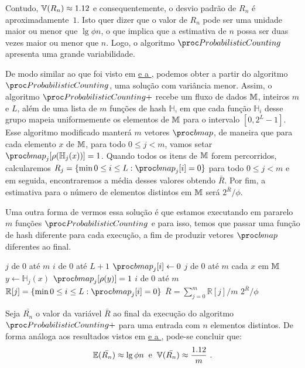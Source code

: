 Contudo, $\Vbb(R_n) \approx\nolinebreak 1.12$ e consequentemente, o desvio padrão de $R_n$ é aproximadamente~$1$. 
Isto quer dizer que o valor de $R_n$ pode ser uma unidade maior ou menor que $\lg \phi n$, o que implica que a 
estimativa de $n$ possa ser duas vezes maior ou menor que $n$. Logo, o algoritmo $\pc$ apresenta uma grande 
variabilidade.

De modo similar ao que foi visto em \hyperref[sec:morris:plus]{ e a }, 
podemos obter a partir do algoritmo~$\pc$, uma solução com variância menor. Assim, o algoritmo $\pc{+}$ recebe um fluxo 
de dados $\mathbb{M}$, inteiros $m$ e $L$, além de uma lista de $m$ funções de hash $\mathbb{H}$, em que cada função 
$\mathbb{H}_i$ desse grupo mapeia uniformemente os elementos de $\mathbb{M}$ para o intervalo $[0, 2^L - 1]$. Esse algoritmo 
modificado manterá $m$ vetores $\bitmap$, de maneira que para cada elemento $x$ de $\mathbb{M}$, para todo $0 \leq j < m$, 
vamos setar $\bitmap_j[\rho(\mathbb{H}_{j}(x))] = 1$. Quando todos os itens de $\mathbb{M}$ forem percorridos, calcularemos 
$R_j = \{ \min 0 \leq i \leq L: \bitmap_{j}[i] = 0 \}$ para todo $0 \leq j < m$ e em seguida, encontraremos a média 
desses valores obtendo $\bar{R}$. Por fim, a estimativa para o número de elementos distintos em $\mathbb{M}$ será 
$2^{\bar{R}} / \phi$. 

Uma outra forma de vermos essa solução é que estamos executando em pararelo $m$ funções $\pc$ e para isso, temos que 
passar uma função de hash diferente para cada execução, a fim de produzir vetores $\bitmap$ diferentes ao final.

\begin{codebox}
  \li \For $j$ de $0$ até $m$
      \Do
  \li    \For $i$ de $0$ até $L + 1$
          \Do
  \li       $\bitmap_{j}[i] \gets 0$
          \End
      \End
  \li \For $j$ de $0$ até $m$
      \Do
  \li    \For cada $x$ em $\mathbb{M}$
          \Do
  \li       $y \gets \mathbb{H}_{j}(x)$
  \li       $\bitmap_j[\rho(y)] = 1$
          \End
      \End
  \li \For $i$ de $0$ até $m$
      \Do
  \li    $\mathbb{R}[j] = \{ \min 0 \leq i \leq L: \bitmap_{j}[i] = 0 \}$
      \End
  \li $\bar{R} = \sum_{j=0}^{m} \mathbb{R}[j] / m$
  \li \Return $2^{\bar{R}}/\phi$
  \End
\end{codebox}

Seja $\bar{R_n}$ o valor da variável $\bar{R}$ ao final da execução do algoritmo~$\pc{+}$ para uma
entrada com $n$ elementos distintos. De forma análoga aos resultados vistos em \hyperref[sec:morris:plus]{ 
e a }, pode-se concluir que:
\[ \mathbb{E}(\bar{R_n}) \approx \lg \phi n   \; \; \text{e}  \; \; \mathbb{V}(\bar{R_n}) \approx \frac{1.12}{m} \ . \]

